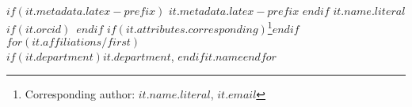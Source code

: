 $if(it.metadata.latex-prefix)$ $it.metadata.latex-prefix$ $endif$%
$it.name.literal$%
$if(it.orcid)$~$endif$%
$if(it.attributes.corresponding)$\footnote{Corresponding author: $it.name.literal$, $it.email$}$endif$%
$for(it.affiliations/first)$\\$if(it.department)${\footnotesize $it.department$}, $endif${\footnotesize $it.name$}$endfor$
